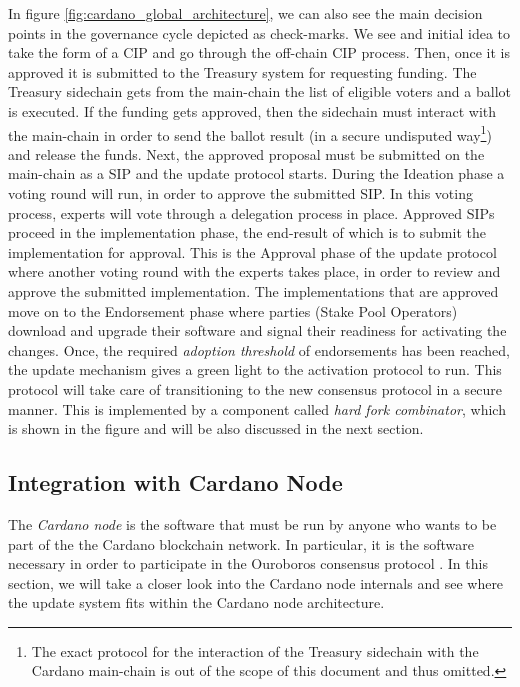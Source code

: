 In figure \ref{fig:cardano_global_architecture}, we can also see the main
decision points in the governance cycle depicted as check-marks. We see and
initial idea to take the form of a CIP and go through the off-chain CIP
process. Then, once it is approved it is submitted to the Treasury system for
requesting funding. The Treasury sidechain gets from the main-chain the list of
eligible voters and a ballot is executed. If the funding gets approved, then
the sidechain must interact with the main-chain in order to send the ballot
result (in a secure undisputed way\footnote{The exact protocol for the
	interaction of the Treasury sidechain with the Cardano main-chain is out of
	the
	scope of this document and thus omitted.}) and release the funds. Next, the
approved
proposal must be submitted on
the main-chain as a SIP and the update protocol starts. During the Ideation
phase a voting round will run, in order to approve the submitted SIP. In this
voting process, experts will vote through a delegation process in place.
Approved SIPs proceed in the implementation phase, the end-result of which is
to submit the implementation for approval. This is the Approval phase of the
update protocol where another voting round with the experts takes place, in
order to review and approve the submitted implementation. The implementations
that are approved move on to the Endorsement phase where parties (Stake Pool
Operators) download and upgrade their software and signal their readiness for
activating the changes. Once, the required \emph{adoption threshold} of
endorsements has been reached, the update mechanism gives a green light to the
activation protocol to run. This protocol will take care of transitioning to
the new consensus protocol in a secure manner. This is
implemented by a component called \emph{hard fork combinator}, which is shown
in the figure and will be also discussed in the next section.

\subsection{Integration with Cardano Node} \label{integration_with_cardano}
The \emph{Cardano node} is the software that must be run by anyone who wants to
be part of the the Cardano blockchain network. In particular, it is the
software necessary in order to participate in the
Ouroboros consensus protocol \cite{C:KRDO17}. In this section, we will take a
closer look into the Cardano node internals and see where the update
system fits within the Cardano node architecture.

